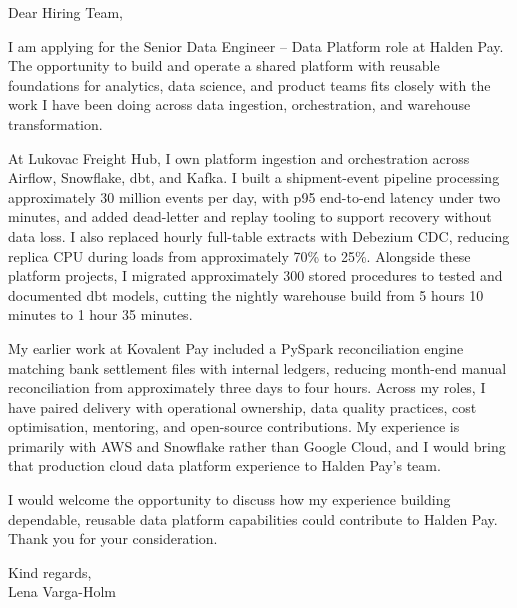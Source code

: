 \documentclass[11pt,a4paper]{article}
\begin{document}
Dear Hiring Team,

I am applying for the Senior Data Engineer – Data Platform role at Halden Pay. The opportunity to build and operate a shared platform with reusable foundations for analytics, data science, and product teams fits closely with the work I have been doing across data ingestion, orchestration, and warehouse transformation.

At Lukovac Freight Hub, I own platform ingestion and orchestration across Airflow, Snowflake, dbt, and Kafka. I built a shipment-event pipeline processing approximately 30 million events per day, with p95 end-to-end latency under two minutes, and added dead-letter and replay tooling to support recovery without data loss. I also replaced hourly full-table extracts with Debezium CDC, reducing replica CPU during loads from approximately 70\% to 25\%. Alongside these platform projects, I migrated approximately 300 stored procedures to tested and documented dbt models, cutting the nightly warehouse build from 5 hours 10 minutes to 1 hour 35 minutes.

My earlier work at Kovalent Pay included a PySpark reconciliation engine matching bank settlement files with internal ledgers, reducing month-end manual reconciliation from approximately three days to four hours. Across my roles, I have paired delivery with operational ownership, data quality practices, cost optimisation, mentoring, and open-source contributions. My experience is primarily with AWS and Snowflake rather than Google Cloud, and I would bring that production cloud data platform experience to Halden Pay's team.

I would welcome the opportunity to discuss how my experience building dependable, reusable data platform capabilities could contribute to Halden Pay. Thank you for your consideration.

Kind regards,\\
Lena Varga-Holm
\end{document}
